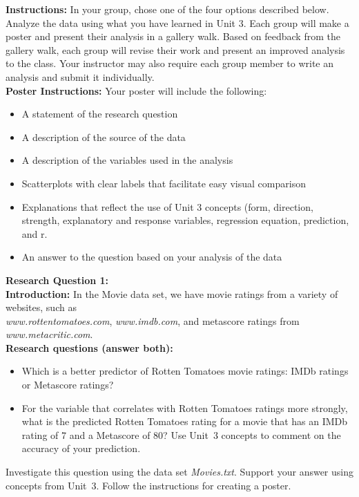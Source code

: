 

\textbf{Instructions:} In your group, chose one of the four options
described below. Analyze the data using what you have learned in Unit
3. Each group will make a poster and present their analysis in a gallery
walk. Based on feedback from the gallery walk, each group will revise
their work and present an improved analysis to the class. Your instructor
may also require each group member to write an analysis and submit
it individually. \\


\textbf{Poster Instructions:} Your poster will include the following: 
\begin{itemize}
\item A statement of the research question 
\item A description of the source of the data 
\item A description of the variables used in the analysis 
\item Scatterplots with clear labels that facilitate easy visual comparison 
\item Explanations that reflect the use of Unit 3 concepts (form, direction,
strength, explanatory and response variables, regression equation,
prediction, and r.
\item An answer to the question based on your analysis of the data \clearpage{}
\end{itemize}
\textbf{\large{}Research Question 1:}\\


\textbf{Introduction:} In the Movie data set, we have movie ratings
from a variety of websites, such as\\ \emph{www.rottentomatoes.com},
\emph{www.imdb.com}, and metascore ratings from \emph{www.metacritic.com}.
\\


\textbf{Research questions (answer both): } 
\begin{itemize}
\item Which is a better predictor of Rotten Tomatoes movie ratings: IMDb
ratings or Metascore ratings? \ 
\item For the variable that correlates with Rotten Tomatoes ratings more
strongly, what is the predicted Rotten Tomatoes rating for a movie
that has an IMDb rating of 7 and a Metascore of 80? Use Unit~3 concepts
to comment on the accuracy of your prediction. 
\end{itemize}
Investigate this question using the data set \emph{Movies.txt}. Support
your answer using concepts from Unit~3. Follow the instructions for
creating a poster.\bigskip{}
\bigskip{}
\bigskip{}


